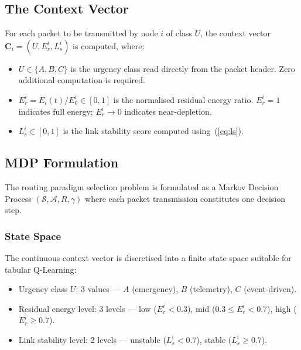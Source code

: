 \documentclass[12pt]{article}
\begin{document}
\subsection{The Context Vector}

For each packet to be transmitted by node $i$ of class $U$, the
context vector $\mathbf{C}_i = (U, E_r^i, L_s^i)$ is computed, where:

\begin{itemize}
\item $U \in \{A, B, C\}$ is the urgency class read directly from the
packet header. Zero additional computation is required.

\item $E_r^i = E_i(t) / E_0^i \in [0, 1]$ is the normalised residual
energy ratio. $E_r^i = 1$ indicates full energy; $E_r^i \to 0$
indicates near-depletion.

\item $L_s^i \in [0, 1]$ is the link stability score computed
using~(\ref{eq:ls}).
\end{itemize}

\subsection{MDP Formulation}

The routing paradigm selection problem is formulated as a Markov
Decision Process $(\mathcal{S}, \mathcal{A}, R, \gamma)$ where each
packet transmission constitutes one decision step.

\subsubsection{State Space}\label{sec:state_space}

The continuous context vector is discretised into a finite state space
suitable for tabular Q-Learning:

\begin{itemize}
\item Urgency class $U$: 3 values --- $A$ (emergency), $B$
(telemetry), $C$ (event-driven).

\item Residual energy level: 3 levels --- low ($E_r^i < 0.3$),
mid ($0.3 \leq E_r^i < 0.7$), high ($E_r^i \geq 0.7$).

\item Link stability level: 2 levels --- unstable ($L_s^i < 0.7$),
stable ($L_s^i \geq 0.7$).
\end{itemize}
\end{document}

